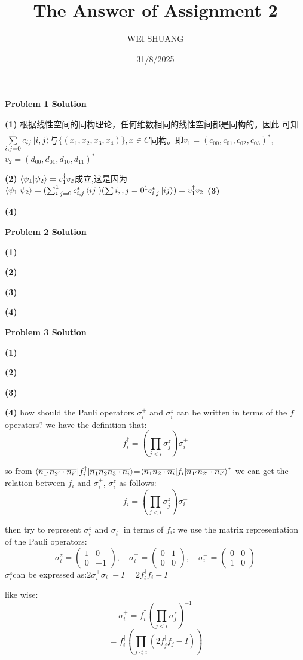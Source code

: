 \documentclass[12pt]{article}
\title{The Answer of Assignment 2}
\author{WEI SHUANG}
\date{31/8/2025}
\begin{document}
\maketitle

\begin{center}
    \textbf{Problem 1 Solution}
\end{center}

\textbf{(1)}
根据线性空间的同构理论，任何维数相同的线性空间都是同构的。因此  
可知$\sum\limits_{i,j=0}^{1}c_{ij}\ket{i,j}$与$\{(x_1,x_2,x_3,x_4)\},x\in C$同构。即$v_1=(c_{00},c_{01},c_{02},c_{03})^*$,$v_2=(d_{00},d_{01},d_{10},d_{11})^*$




\textbf{(2)}
$\braket{\psi_1|\psi_2}=v_1^\dagger v_2$成立,这是因为
$\braket{\psi_1|\psi_2}=(\sum_{i,j=0}^1c_{i,j}^*\bra{ij})(\sum{i,,j=0}^1c_{i,j}^*\ket{ij})=v_1^\dagger v_2$
\textbf{(3)}

\textbf{(4)}
\begin{center}
    \textbf{Problem 2 Solution}
\end{center}

\textbf{(1)}

\textbf{(2)}

\textbf{(3)}

\textbf{(4)}

\begin{center}
    \textbf{Problem 3 Solution}
\end{center}

\textbf{(1)}

\textbf{(2)}

\textbf{(3)}

\textbf{(4)}
how should the Pauli operators $\sigma_i^+ $ and $\sigma_i^z $ can be written in terms of the  $f$ operators? 
we have the definition that:\[
f_i^\dagger = \left( \prod_{j<i} \sigma_j^z \right) \sigma_i^+
\]

so from $\braket{\overline{n_{1'}n_{2'}\cdot n_{i'}}|f_i^\dagger|\overline{n_1n_2n_3\cdot n_i}}$=$\braket{\overline{n_{1}n_{2}\cdot n_{i}}|f_i|\overline{n_{1'}n_{2'}\cdot n_{i'}}}^*$
we can get the relation between $f_i$ and $\sigma_i^+$, $\sigma_i^z$ as follows:
\[
f_i = \left( \prod_{j<i} \sigma_j^z \right) \sigma_i^-
\]

then try to represent $\sigma_i^z$ and $\sigma_i^+$ in terms of $f_i$:
we use the matrix representation of the Pauli operators:
\[
\sigma_i^z = \begin{pmatrix}
1 & 0 \\
0 & -1
\end{pmatrix}, \quad \sigma_i^+ = \begin{pmatrix}
0 & 1 \\
0 & 0
\end{pmatrix}, \quad \sigma_i^- = \begin{pmatrix}
0 & 0 \\
1 & 0
\end{pmatrix}
\]
$\sigma_i^z  $can be expressed as:$  2\sigma_i^+\sigma_i^- -I = 2f_i^{\dagger} f_i-I$


like wise:
\[
\sigma_i^+ = f_i^{\dagger} \left( \prod_{j<i} \sigma_j^z \right)^{-1}
\]
\[
= f_i^{\dagger} \left( \prod_{j<i} (2f_j^{\dagger} f_j - I) \right)
\]
\end{document}
